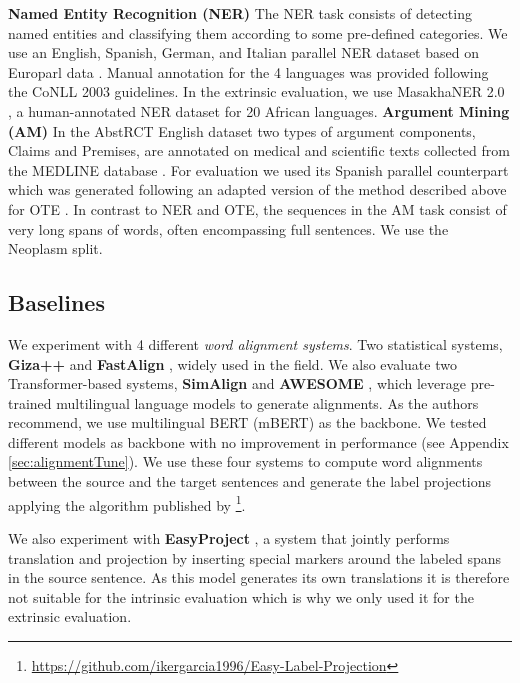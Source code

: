 \documentclass[11pt]{article}
\begin{document}
\textbf{Named Entity Recognition (NER)} The NER task consists of detecting
named entities and classifying them according to some pre-defined categories. We
use an English, Spanish, German, and Italian parallel NER dataset
\cite{agerri-etal-2018-building} based on Europarl data
\cite{DBLP:conf/mtsummit/Koehn05}. Manual annotation for the 4 languages was
provided following the CoNLL 2003 \cite{tjong-kim-sang-de-meulder-2003-introduction} guidelines. 
In the extrinsic evaluation, we use MasakhaNER 2.0 \cite{adelani-etal-2022-masakhaner}, a human-annotated NER dataset for 20 African languages.
\textbf{Argument Mining (AM)} In the AbstRCT English dataset two types of
argument components, Claims and Premises, are annotated on medical and
scientific texts collected from the MEDLINE database
\cite{DBLP:conf/ecai/0002CV20}. For evaluation we used its Spanish
parallel counterpart which was generated following an adapted version of the method
described above for OTE \cite{DBLP:journals/corr/abs-2301-10527}. In contrast to NER and OTE, the sequences in the AM task consist of very long spans of words, often encompassing full sentences. We use the Neoplasm split.

\subsection{Baselines}

We experiment with 4 different \emph{word alignment systems}. Two statistical systems,
\textbf{Giza++} \cite{och-ney-2003-systematic} and \textbf{FastAlign} \cite{fastalign}, widely used in the field. We also evaluate two Transformer-based systems, \textbf{SimAlign} \cite{jalili-sabet-etal-2020-simalign} and \textbf{AWESOME}
\cite{DBLP:conf/eacl/DouN21}, which leverage pre-trained multilingual language models to generate alignments. As the authors recommend, we use multilingual BERT (mBERT) \cite{DBLP:conf/naacl/DevlinCLT19} as the backbone. We tested different models as backbone with no improvement in performance (see Appendix
\ref{sec:alignmentTune}). We use these four systems to compute word alignments between
the source and the target sentences and generate the label projections applying the algorithm published by \citet{garcia-ferrero-etal-2022-model}\footnote{\url{https://github.com/ikergarcia1996/Easy-Label-Projection}}. 

We also experiment with \textbf{EasyProject} \cite{DBLP:journals/corr/abs-2211-15613}, a system that jointly performs translation and projection by inserting special markers around the labeled spans in the source sentence. As this model generates its own translations it is therefore not suitable for the intrinsic evaluation which is why we only used it for the extrinsic evaluation. 
\end{document}
